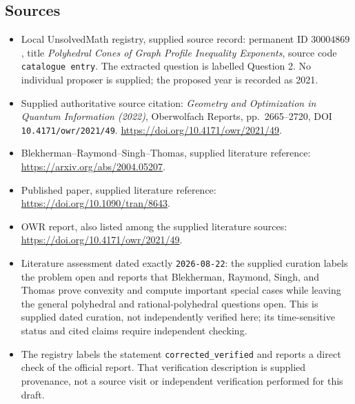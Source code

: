 \documentclass[11pt]{article}
\begin{document}
\subsection{Sources}
\begin{itemize}
\item Local UnsolvedMath registry, supplied source record: permanent ID \(30004869\), title \emph{Polyhedral Cones of Graph Profile Inequality Exponents}, source code \texttt{catalogue entry}. The extracted question is labelled Question 2. No individual proposer is supplied; the proposed year is recorded as 2021.
\item Supplied authoritative source citation: \emph{Geometry and Optimization in Quantum Information (2022)}, Oberwolfach Reports, pp.\ 2665--2720, DOI \texttt{10.4171/owr/2021/49}. \url{https://doi.org/10.4171/owr/2021/49}.
\item Blekherman--Raymond--Singh--Thomas, supplied literature reference: \url{https://arxiv.org/abs/2004.05207}.
\item Published paper, supplied literature reference: \url{https://doi.org/10.1090/tran/8643}.
\item OWR report, also listed among the supplied literature sources: \url{https://doi.org/10.4171/owr/2021/49}.
\item Literature assessment dated exactly \texttt{2026-08-22}: the supplied curation labels the problem open and reports that Blekherman, Raymond, Singh, and Thomas prove convexity and compute important special cases while leaving the general polyhedral and rational-polyhedral questions open. This is supplied dated curation, not independently verified here; its time-sensitive status and cited claims require independent checking.
\item The registry labels the statement \texttt{corrected\_verified} and reports a direct check of the official report. That verification description is supplied provenance, not a source visit or independent verification performed for this draft.
\end{itemize}
\end{document}
